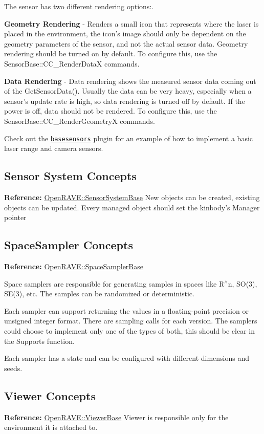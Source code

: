 The sensor has two different rendering options:.


\begin{DoxyItemize}
\item {\bfseries Geometry Rendering} -\/ Renders a small icon that represents where the laser is placed in the environment, the icon's image should only be dependent on the geometry parameters of the sensor, and not the actual sensor data. Geometry rendering should be turned on by default. To configure this, use the SensorBase::CC\_\-RenderDataX commands.
\end{DoxyItemize}


\begin{DoxyItemize}
\item {\bfseries Data Rendering} -\/ Data rendering shows the measured sensor data coming out of the GetSensorData(). Usually the data can be very heavy, especially when a sensor's update rate is high, so data rendering is turned off by default. If the power is off, data should not be rendered. To configure this, use the SensorBase::CC\_\-RenderGeometryX commands.
\end{DoxyItemize}

Check out the \href{../main/plugins.html#basesensors}{\tt basesensors} plugin for an example of how to implement a basic laser range and camera sensors. \hypertarget{arch_sensorsystem}{}\subsection{Sensor System Concepts}\label{arch_sensorsystem}
{\bfseries Reference:} \hyperlink{classOpenRAVE_1_1SensorSystemBase}{OpenRAVE::SensorSystemBase} New objects can be created, existing objects can be updated. Every managed object should set the kinbody's Manager pointer \hypertarget{arch_spacesampler}{}\subsection{SpaceSampler Concepts}\label{arch_spacesampler}
{\bfseries Reference:} \hyperlink{classOpenRAVE_1_1SpaceSamplerBase}{OpenRAVE::SpaceSamplerBase}

Space samplers are responsible for generating samples in spaces like R$^\wedge$n, SO(3), SE(3), etc. The samples can be randomized or deterministic.

Each sampler can support returning the values in a floating-\/point precision or unsigned integer format. There are sampling calls for each version. The samplers could choose to implement only one of the types of both, this should be clear in the Supports function.

Each sampler has a state and can be configured with different dimensions and seeds. \hypertarget{arch_viewer}{}\subsection{Viewer Concepts}\label{arch_viewer}
{\bfseries Reference:} \hyperlink{classOpenRAVE_1_1ViewerBase}{OpenRAVE::ViewerBase} Viewer is responsible only for the environment it is attached to. 